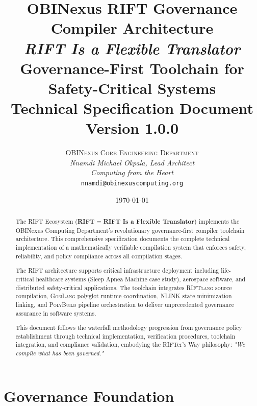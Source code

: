 \documentclass[12pt,a4paper]{report}
\title{
    \vspace{-1cm}
    \Huge\textbf{OBINexus RIFT Governance}\\
    \Huge\textbf{Compiler Architecture}\\[0.4cm]
    \Large\textit{RIFT Is a Flexible Translator}\\[0.4cm]
    \large Governance-First Toolchain for Safety-Critical Systems\\[0.4cm]
    \normalsize Technical Specification Document\\
    \normalsize Version 1.0.0
}
\author{
    \textsc{OBINexus Core Engineering Department}\\[0.2cm]
    \textit{Nnamdi Michael Okpala, Lead Architect}\\[0.1cm]
    \textit{Computing from the Heart}\\[0.3cm]
    \small\texttt{nnamdi@obinexuscomputing.org}
}
\date{\today}
\newcommand{\riftlang}{\textsc{RIFTlang}}
\newcommand{\gosilang}{\textsc{GosiLang}}
\newcommand{\nlink}{\textsc{NLINK}}
\newcommand{\polybuild}{\textsc{PolyBuild}}
\theoremstyle{definition}
\theoremstyle{remark}
\begin{document}
\maketitle
\thispagestyle{empty}

\begin{abstract}
The RIFT Ecosystem (\textbf{RIFT} = \textbf{RIFT Is a Flexible Translator}) implements the OBINexus Computing Department's revolutionary governance-first compiler toolchain architecture. This comprehensive specification documents the complete technical implementation of a mathematically verifiable compilation system that enforces safety, reliability, and policy compliance across all compilation stages.

The RIFT architecture supports critical infrastructure deployment including life-critical healthcare systems (Sleep Apnea Machine case study), aerospace software, and distributed safety-critical applications. The toolchain integrates \riftlang{} source compilation, \gosilang{} polyglot runtime coordination, \nlink{} state minimization linking, and \polybuild{} pipeline orchestration to deliver unprecedented governance assurance in software systems.

This document follows the waterfall methodology progression from governance policy establishment through technical implementation, verification procedures, toolchain integration, and compliance validation, embodying the RIFTer's Way philosophy: \textit{"We compile what has been governed."}
\end{abstract}

\newpage

\tableofcontents
\newpage

\part{Governance Foundation}
\end{document}
